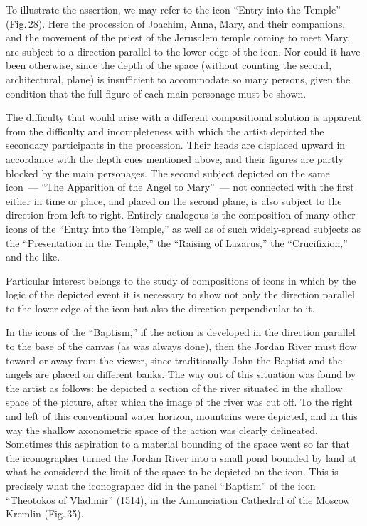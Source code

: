 
To illustrate the assertion, we may refer to the icon ``Entry into the Temple'' (Fig.\,28).
Here the procession of Joachim, Anna, Mary, and their companions, and the movement
of the priest of the Jerusalem temple coming to meet Mary, are subject to a direction
parallel to the lower edge of the icon.  Nor could it have been otherwise, since the depth
of the space (without counting the second, architectural, plane) is insufficient to
accommodate so many persons, given the condition that the full figure of each main
personage must be shown.


The difficulty that would arise with a different compositional solution is apparent from
the difficulty and incompleteness with which the artist depicted the secondary
participants in the procession.  Their heads are displaced upward in accordance with
the depth cues mentioned above, and their figures are partly blocked by the main
personages.  The second subject depicted on the same icon~--- ``The Apparition of the
Angel to Mary''~--- not connected with the first either in time or place, and placed on
the second plane, is also subject to the direction from left to right.  Entirely analogous
is the composition of many other icons of the ``Entry into the Temple,'' as well as of
such widely-spread subjects as the ``Presentation in the Temple,'' the ``Raising of
Lazarus,'' the ``Crucifixion,'' and the like.

Particular interest belongs to the study of compositions of icons in which by the logic
of the depicted event it is necessary to show not only the direction parallel to the lower
edge of the icon but also the direction perpendicular to it.

In the icons of the ``Baptism,'' if the action is developed in the direction parallel to the
base of the canvas (as was always done), then the Jordan River must flow toward or
away from the viewer, since traditionally John the Baptist and the angels are placed on
different banks.  The way out of this situation was found by the artist as follows: he
depicted a section of the river situated in the shallow space of the picture, after which
the image of the river was cut off.  To the right and left of this conventional water
horizon, mountains were depicted, and in this way the shallow axonometric space of
the action was clearly delineated.  Sometimes this aspiration to a material bounding of
the space went so far that the iconographer turned the Jordan River into a small pond
bounded by land at what he considered the limit of the space to be depicted on the icon.
This is precisely what the iconographer did in the panel ``Baptism'' of the icon
``Theotokos of Vladimir'' (1514), in the Annunciation Cathedral of the Moscow Kremlin
(Fig.\,35).

